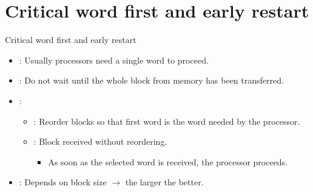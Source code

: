 \section{Critical word first and early restart}

\begin{frame}[t]{Critical word first and early restart}
\begin{itemize}
  \item {}: 
        Usually processors need a single word to proceed.

  \item {}: 
        Do not wait until the whole block from memory has been transferred.

  \item {}:
    \begin{itemize}
      \item {}: 
            Reorder blocks so that first word is the word needed by the processor.

      \item {}: 
            Block received without reordering.
        \begin{itemize}
          \item As soon as the selected word is received, the processor proceeds.
        \end{itemize}
    \end{itemize}

  \item {}:
        Depends on block size $\rightarrow$ the larger the better.


\end{itemize}
\end{frame}
